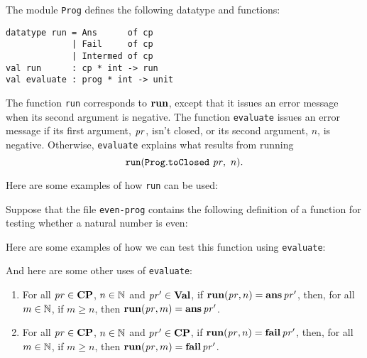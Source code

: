 The module \texttt{Prog} defines the following datatype and functions:
\begin{verbatim}
datatype run = Ans      of cp
             | Fail     of cp
             | Intermed of cp
val run      : cp * int -> run
val evaluate : prog * int -> unit
\end{verbatim}
%
%
%
%
%
The function \texttt{run} corresponds to $\mathbf{run}$, except that it issues
an error message when its second argument is negative.  The function
\texttt{evaluate} issues an error message if its first argument,
$\mathit{pr}$, isn't closed, or its second argument, $n$, is negative.
Otherwise, \texttt{evaluate} explains what results from running
\begin{displaymath}
  \mathtt{run}(\mathtt{Prog.toClosed}~\mathit{pr},~n).
\end{displaymath}

Here are some examples of how \texttt{run} can be used:

Suppose that the file \texttt{even-prog} contains the following
definition of a function for testing whether a natural number is even:

Here are some examples of how we can test this function using
\texttt{evaluate}:

And here are some other uses of \texttt{evaluate}:


\begin{proposition}
\begin{enumerate}
\item For all $\mathit{pr}\in\mathbf{CP}$, $n\in\mathbb{N}$ and $\mathit{pr}'\in\mathbf{Val}$, if
  $\mathbf{run}(\mathit{pr},n) = \mathbf{ans}\,\mathit{pr}'$, then, for all $m\in\mathbb{N}$, if $m\geq n$,
  then $\mathbf{run}(\mathit{pr},m) = \mathbf{ans}\,\mathit{pr}'$.

\item For all $\mathit{pr}\in\mathbf{CP}$, $n\in\mathbb{N}$ and $\mathit{pr}'\in\mathbf{CP}$, if
  $\mathbf{run}(\mathit{pr},n) = \mathbf{fail}\,\mathit{pr}'$, then, for all $m\in\mathbb{N}$, if $m\geq n$,
  then $\mathbf{run}(\mathit{pr},m) = \mathbf{fail}\,\mathit{pr}'$.
\end{enumerate}
\end{proposition}

